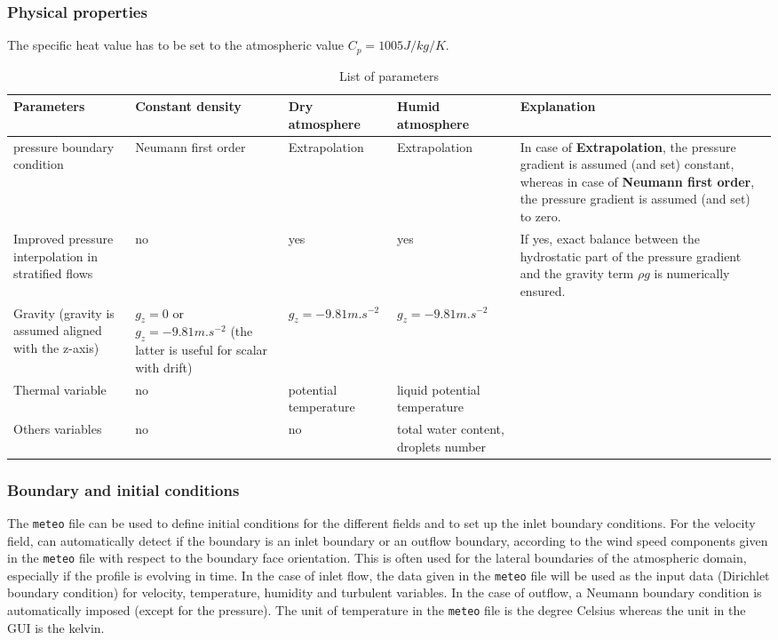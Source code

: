 {{\subsubsection{Physical properties}
%
The specific heat value has to be set to the atmospheric value
$C_{p}=1005 J/kg/K$.
%
\begin{table}[ht]\label{tab:param_list}
\begin{center}
\begin{tabular}{|p{80pt}|p{70pt}|p{70pt}|p{80pt}|p{100pt}|}
\hline
\textbf{Parameters} & \textbf{Constant density} & \textbf{Dry atmosphere} & \textbf{Humid atmosphere} & \textbf{Explanation} \\
\hline
pressure boundary condition & Neumann first order & Extrapolation & Extrapolation &
In case of \textbf{Extrapolation}, the pressure gradient is assumed (and set) constant, whereas in case of \textbf{Neumann first order},
the pressure gradient is assumed (and set) to zero. \\
\hline
Improved pressure interpolation in stratified flows & no & yes & yes & If yes, exact balance between the hydrostatic part of the pressure gradient and the gravity term $\rho g$ is numerically ensured. \\
\hline
Gravity (gravity is assumed aligned with the z-axis) & $g_z=0$ or $g_z=-9.81 m.s^{-2}$ (the latter is useful for scalar with drift) & $g_z=-9.81 m.s^{-2}$ & $g_z=-9.81 m.s^{-2}$ &  \\
\hline
Thermal variable & no & potential temperature & liquid potential temperature &  \\
\hline
Others variables & no & no & total water content, droplets number &  \\
\hline
\end{tabular}\label{tab1}
\caption[List of parameters]{List of parameters}
\end{center}
\end{table}
%
\subsubsection{Boundary and initial conditions}\label{sec:atmo_BCs}
%
The \texttt{meteo} file can be used to define initial conditions for the
different fields and to set up the inlet boundary conditions. For the velocity
field, \CS can automatically detect if the boundary is an inlet boundary or an
outflow boundary, according to the wind speed components given in the
\texttt{meteo} file with respect to the boundary face orientation. This is often
used for the lateral boundaries of the atmospheric domain, especially if the
profile is evolving in time. In the case of inlet flow, the data given in the
\texttt{meteo} file will be used as the input data (Dirichlet boundary condition)
for velocity, temperature, humidity and turbulent variables. In the case of
outflow, a Neumann boundary condition is automatically imposed (except for the
pressure). The unit of temperature in the \texttt{meteo} file is the degree
Celsius whereas the unit in the GUI is the kelvin.

}}
